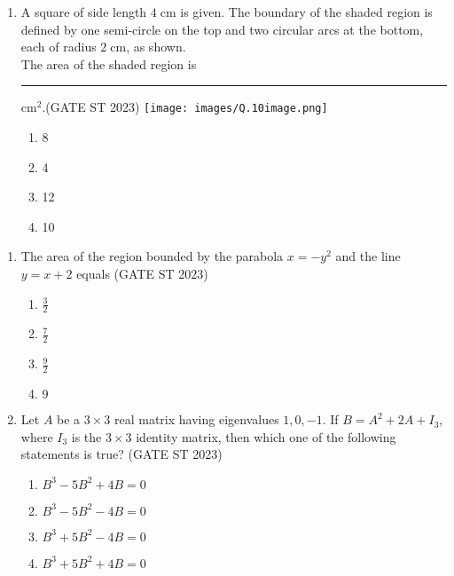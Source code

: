 \documentclass[journal]{IEEEtran}
\begin{document}
\begin{enumerate}[label=\textbf{Q.\arabic*.}, start=1, align=left, itemsep=2em]
\begin{enumerate}[label=\textbf{Q.\arabic*.}, start=6, align=left, itemsep=2em]
\item A square of side length $4\;\mathrm{cm}$ is given. The boundary of the shaded region is defined by one semi-circle on the top and two circular arcs at the bottom, each of radius $2\;\mathrm{cm}$, as shown.\\
The area of the shaded region is \rule{3cm}{0.1pt} cm$^2$.\hfill(GATE ST 2023)
    \texttt{[image: images/Q.10image.png]}
\begin{enumerate}[label=(\Alph*)]
    \item 8
    \item 4
    \item 12
    \item 10
\end{enumerate}

\end{enumerate}

\begin{enumerate}[label=\textbf{Q.\arabic*.}, start=11, align=left, itemsep=2em]

\item The area of the region bounded by the parabola $x = -y^2$ and the line $y = x + 2$ equals \hfill(GATE ST 2023) 
\begin{enumerate}[label=(\Alph*)]
    \item $\frac{3}{2}$
    \item $\frac{7}{2}$
    \item $\frac{9}{2}$
    \item $9$
\end{enumerate}

\item Let $A$ be a $3 \times 3$ real matrix having eigenvalues $1, 0, -1$. If $B = A^2 + 2A + I_3$, where $I_3$ is the $3\times 3$ identity matrix, then which one of the following statements is true? \hfill(GATE ST 2023) 
\begin{enumerate}[label=(\Alph*)]
    \item $B^3 - 5B^2 + 4B = 0$
    \item $B^3 - 5B^2 - 4B = 0$
    \item $B^3 + 5B^2 - 4B = 0$
    \item $B^3 + 5B^2 + 4B = 0$
\end{enumerate}


\end{enumerate}
\end{enumerate}
\end{document}
